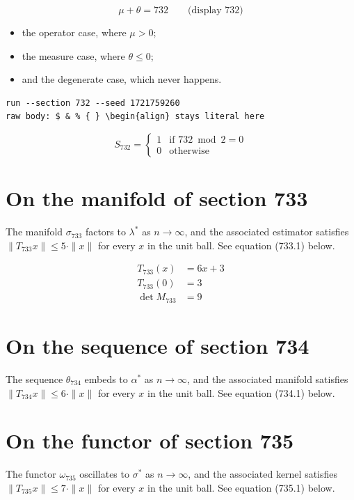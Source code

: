 \documentclass{article}
\begin{document}
$$
\mu + \theta = 732 \qquad \text{(display 732)}
$$

\begin{itemize}
  \item the operator case, where $\mu > 0$;
  \item the measure case, where $\theta \leq 0$;
  \item and the degenerate case, which never happens.
\end{itemize}

\begin{verbatim}
run --section 732 --seed 1721759260
raw body: $ & % { } \begin{align} stays literal here
\end{verbatim}

\begin{equation}
S_{732} = \begin{cases} 1 & \text{if } 732 \bmod 2 = 0 \\ 0 & \text{otherwise} \end{cases}
\end{equation}

\section{On the manifold of section 733}
The manifold $\sigma_{733}$ factors to $\lambda^{*}$ as $n \to \infty$,
and the associated estimator satisfies $\|T_{733} x\| \leq 5 \cdot \|x\|$
for every $x$ in the unit ball. See equation (733.1) below.

\begin{align}
T_{733}(x) &= 6 x + 3 \\
T_{733}(0) &= 3 \\
\det M_{733} &= 9
\end{align}

\section{On the sequence of section 734}
The sequence $\theta_{734}$ embeds to $\alpha^{*}$ as $n \to \infty$,
and the associated manifold satisfies $\|T_{734} x\| \leq 6 \cdot \|x\|$
for every $x$ in the unit ball. See equation (734.1) below.

\section{On the functor of section 735}
The functor $\omega_{735}$ oscillates to $\sigma^{*}$ as $n \to \infty$,
and the associated kernel satisfies $\|T_{735} x\| \leq 7 \cdot \|x\|$
for every $x$ in the unit ball. See equation (735.1) below.
\end{document}
